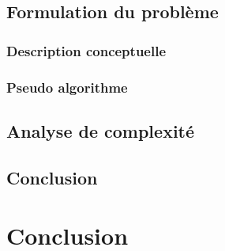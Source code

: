 \documentclass[a4paper,oneside,12pt]{report}
\theoremstyle{definition}
\newtheorem{defn}{Definition}[section]
\begin{document}
		\section{Formulation du problème}
			\subsection{Description conceptuelle}
			\subsection{Pseudo algorithme}
		\section{Analyse de complexité}
		\section{Conclusion}
	
	
	
	
	

\chapter{Conclusion} 




\newpage


\end{document}
